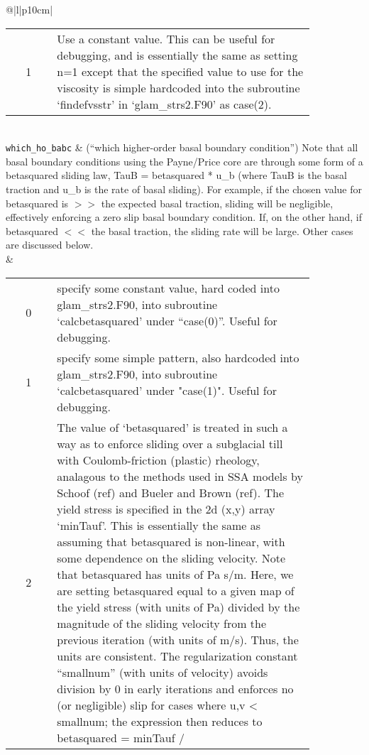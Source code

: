 \begin{center}
\begin{supertabular*}{\textwidth}{@{\extracolsep{\fill}}|l|p{10cm}|}
\begin{tabular}[t]{cp{0.85\linewidth}}
      1 & Use a constant value. This can be useful for debugging, and is
          essentially the same as setting n=1 except that the specified value to
          use for the viscosity is simple hardcoded into the subroutine
          `findefvsstr' in `glam\_strs2.F90' as case(2).\\
    \end{tabular}\\  
    \hline
    \texttt{which\_ho\_babc} & 
     (``which higher-order basal boundary condition'')
     Note that all basal boundary conditions using the Payne/Price core are
     through some form of a betasquared sliding law, TauB = betasquared *
     u\_b (where TauB is the basal traction and u\_b is the rate of basal
     sliding). For example, if the chosen value for betasquared is $>>$ the
     expected basal traction, sliding will be negligible, effectively
     enforcing a zero slip basal boundary condition. If, on the other hand,
     if betasquared $<<$ the basal traction, the sliding rate will be large.
     Other cases are discussed below. \\ &
    \begin{tabular}[t]{cp{0.85\linewidth}}
      0 & specify some constant value, hard coded into glam\_strs2.F90, into
          subroutine `calcbetasquared' under ``case(0)''. Useful for debugging.\\
      1 & specify some simple pattern, also hardcoded into glam\_strs2.F90,
          into subroutine `calcbetasquared' under "case(1)". Useful for
          debugging. \\
      2 & The value of `betasquared' is treated in such a way as to enforce
          sliding over a subglacial till with Coulomb-friction (plastic)
          rheology, analagous to the methods used in SSA models by Schoof (ref)
          and Bueler and Brown (ref). The yield stress is specified in the 2d
          (x,y) array `minTauf'. This is essentially the same as assuming that
          betasquared is non-linear, with some dependence on the sliding
          velocity. Note that betasquared has units of Pa s/m. Here, we are
          setting betasquared equal to a given map of the yield stress (with
          units of Pa) divided by the magnitude of the sliding velocity from the
          previous iteration (with units of m/s). Thus, the units are
          consistent. The regularization constant ``smallnum'' (with units of
          velocity) avoids division by 0 in early iterations and enforces no (or
          negligible) slip for cases where
          u,v < smallnum; the expression then reduces to betasquared = minTauf /

\end{tabular}
\end{supertabular*}
\end{center}
